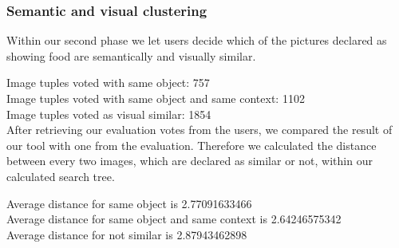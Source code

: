 \subsubsection*{Semantic and visual clustering}

Within our second phase we let users decide which of the pictures declared as showing food are semantically and visually similar. 

Image tuples voted with same object: 757 \\
Image tuples voted with same object and same context: 1102 \\
Image tuples voted as visual similar: 1854 \\

After retrieving our evaluation votes from the users, we compared the result of our tool with one from the evaluation. Therefore we calculated the distance between every two images, which are declared as similar or not, within our calculated search tree. 

Average distance for same object  is 2.77091633466  \\
Average distance for same object and same context is 2.64246575342 \\
Average distance for not similar  is 2.87943462898 \\


